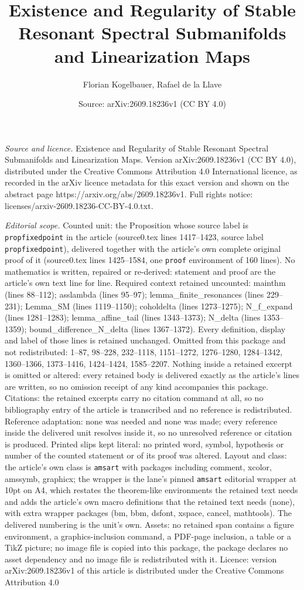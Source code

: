 \documentclass[10pt,a4paper]{amsart}
\title[Existence and Regularity of Stable Resonant Spectral Submani]{Existence and Regularity of Stable Resonant Spectral Submanifolds and Linearization Maps}
\author{Florian Kogelbauer, Rafael de la Llave}
\date{Source: arXiv:2609.18236v1 (CC BY 4.0)}
\begin{document}
\maketitle

\noindent\emph{Source and licence.} Existence and Regularity of Stable Resonant Spectral Submanifolds and Linearization Maps. Version arXiv:2609.18236v1 (CC BY 4.0), distributed under the Creative Commons Attribution 4.0 International licence, as recorded in the arXiv licence metadata for this exact version and shown on the abstract page https://arxiv.org/abs/2609.18236v1. Full rights notice: licenses/arxiv-2609.18236-CC-BY-4.0.txt.\par\smallskip

\noindent\textit{Editorial scope.} Counted unit: the Proposition whose source label is \texttt{propfixedpoint} in the article (source0.tex lines 1417--1423, source label \texttt{propfixedpoint}), delivered together with the article's own complete original proof of it (source0.tex lines 1425--1584, one \texttt{proof} environment of 160 lines). No mathematics is written, repaired or re-derived: statement and proof are the article's own text line for line. Required context retained uncounted: mainthm (lines 88--112); asslambda (lines 95--97); lemma\_finite\_resonances (lines 229--231); Lemma\_SM (lines 1119--1150); coholdelta (lines 1273--1275); N\_f\_expand (lines 1281--1283); lemma\_affine\_tail (lines 1343--1373); N\_delta (lines 1353--1359); bound\_difference\_N\_delta (lines 1367--1372). Every definition, display and label of those lines is retained unchanged. Omitted from this package and not redistributed: 1--87, 98--228, 232--1118, 1151--1272, 1276--1280, 1284--1342, 1360--1366, 1373--1416, 1424--1424, 1585--2207. Nothing inside a retained excerpt is omitted or altered: every retained body is delivered exactly as the article's lines are written, so no omission receipt of any kind accompanies this package. Citations: the retained excerpts carry no citation command at all, so no bibliography entry of the article is transcribed and no reference is redistributed. Reference adaptation: none was needed and none was made; every reference inside the delivered unit resolves inside it, so no unresolved reference or citation is produced. Printed slips kept literal: no printed word, symbol, hypothesis or number of the counted statement or of its proof was altered. Layout and class: the article's own class is \texttt{amsart} with packages including comment, xcolor, amssymb, graphicx; the wrapper is the lane's pinned \texttt{amsart} editorial wrapper at 10pt on A4, which restates the theorem-like environments the retained text needs and adds the article's own macro definitions that the retained text needs (none), with extra wrapper packages (bm, bbm, dsfont, xspace, cancel, mathtools). The delivered numbering is the unit's own. Assets: no retained span contains a figure environment, a graphics-inclusion command, a PDF-page inclusion, a table or a TikZ picture; no image file is copied into this package, the package declares no asset dependency and no image file is redistributed with it. Licence: version arXiv:2609.18236v1 of this article is distributed under the Creative Commons Attribution 4.0 
\end{document}

